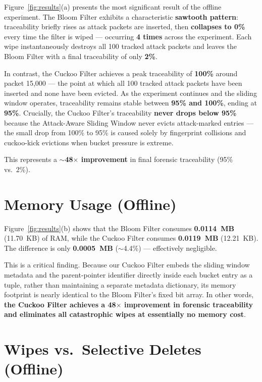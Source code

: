 \documentclass[12pt, a4paper]{report}
\begin{document}
Figure~\ref{fig:results}(a) presents the most significant result of the
offline experiment. The Bloom Filter exhibits a characteristic
\textbf{sawtooth pattern}: traceability briefly rises as attack packets
are inserted, then \textbf{collapses to 0\%} every time the filter is
wiped --- occurring \textbf{4 times} across the experiment. Each wipe
instantaneously destroys all 100 tracked attack packets and leaves the
Bloom Filter with a final traceability of only \textbf{2\%}.

In contrast, the Cuckoo Filter achieves a peak traceability of
\textbf{100\%} around packet 15{,}000 --- the point at which all 100
tracked attack packets have been inserted and none have been evicted.
As the experiment continues and the sliding window operates, traceability
remains stable between \textbf{95\% and 100\%}, ending at \textbf{95\%}.
Crucially, the Cuckoo Filter's traceability \textbf{never drops below
95\%} because the Attack-Aware Sliding Window never evicts attack-marked
entries --- the small drop from 100\% to 95\% is caused solely by
fingerprint collisions and cuckoo-kick evictions when bucket pressure is
extreme.

This represents a \textbf{$\sim$48$\times$ improvement} in final forensic
traceability (95\% vs.\ 2\%).

\section{Memory Usage (Offline)}\label{sec:offline-memory}

Figure~\ref{fig:results}(b) shows that the Bloom Filter consumes
\textbf{0.0114~MB} (11.70~KB) of RAM, while the Cuckoo Filter consumes
\textbf{0.0119~MB} (12.21~KB). The difference is only
\textbf{0.0005~MB} ($\sim$4.4\%) --- effectively negligible.

This is a critical finding. Because our Cuckoo Filter embeds the sliding
window metadata and the parent-pointer identifier directly inside each
bucket entry as a tuple, rather than maintaining a separate metadata
dictionary, its memory footprint is nearly identical to the Bloom
Filter's fixed bit array. In other words, \textbf{the Cuckoo Filter
achieves a 48$\times$ improvement in forensic traceability and eliminates
all catastrophic wipes at essentially no memory cost}.

\section{Wipes vs.\ Selective Deletes (Offline)}
\end{document}
